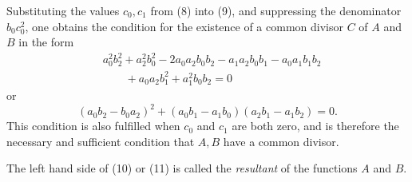 \documentclass[11pt]{article}
\begin{document}
Substituting the values $c_0,c_1$ from (8) into (9), and suppressing the denominator $b_0c_0^2$, one obtains the condition for the existence of a common divisor $C$ of $A$ and $B$ in the form
\begin{equation}
\begin{aligned}
&a_0^2b_2^2+a_2^2b_0^2-2a_0a_2b_0b_2-a_1a_2b_0b_1-a_0a_1b_1b_2\\
&\qquad{}+a_0a_2b_1^2+a_1^2b_0b_2=0
\end{aligned}
\tag{10}
\end{equation}
or
\begin{equation}
 (a_0b_2-b_0a_2)^2+(a_0b_1-a_1b_0)(a_2b_1-a_1b_2)=0.
\tag{11}
\end{equation}
This condition is also fulfilled when $c_0$ and $c_1$ are both zero, and is therefore the necessary and sufficient condition that $A,B$ have a common divisor.

The left hand side of (10) or (11) is called the \emph{resultant} of the functions $A$ and $B$.
\end{document}
